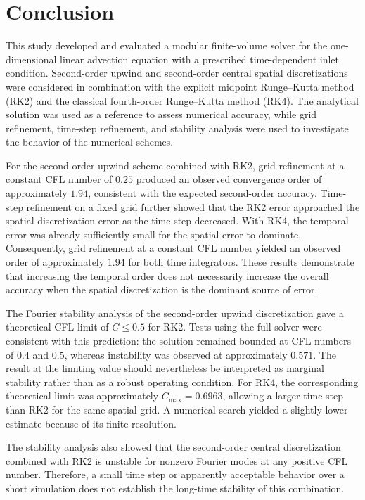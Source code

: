 \section{Conclusion}
\label{sec:conclusion}

This study developed and evaluated a modular finite-volume solver for the one-dimensional linear advection equation with a prescribed time-dependent inlet condition. Second-order upwind and second-order central spatial discretizations were considered in combination with the explicit midpoint Runge--Kutta method (RK2) and the classical fourth-order Runge--Kutta method (RK4). The analytical solution was used as a reference to assess numerical accuracy, while grid refinement, time-step refinement, and stability analysis were used to investigate the behavior of the numerical schemes.

For the second-order upwind scheme combined with RK2, grid refinement at a constant CFL number of $0.25$ produced an observed convergence order of approximately $1.94$, consistent with the expected second-order accuracy. Time-step refinement on a fixed grid further showed that the RK2 error approached the spatial discretization error as the time step decreased. With RK4, the temporal error was already sufficiently small for the spatial error to dominate. Consequently, grid refinement at a constant CFL number yielded an observed order of approximately $1.94$ for both time integrators. These results demonstrate that increasing the temporal order does not necessarily increase the overall accuracy when the spatial discretization is the dominant source of error.

The Fourier stability analysis of the second-order upwind discretization gave a theoretical CFL limit of $C\leq 0.5$ for RK2. Tests using the full solver were consistent with this prediction: the solution remained bounded at CFL numbers of $0.4$ and $0.5$, whereas instability was observed at approximately $0.571$. The result at the limiting value should nevertheless be interpreted as marginal stability rather than as a robust operating condition. For RK4, the corresponding theoretical limit was approximately $C_{\max}=0.6963$, allowing a larger time step than RK2 for the same spatial grid. A numerical search yielded a slightly lower estimate because of its finite resolution.

The stability analysis also showed that the second-order central discretization combined with RK2 is unstable for nonzero Fourier modes at any positive CFL number. Therefore, a small time step or apparently acceptable behavior over a short simulation does not establish the long-time stability of this combination.


